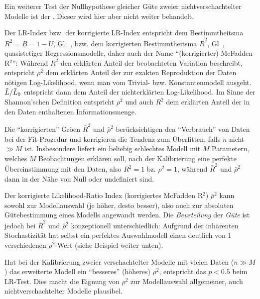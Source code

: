   \item Ein weiterer Test der Nullhypothese gleicher G\"ute zweier
    nichtverschachtelter Modelle ist der
    . Dieser wird hier aber nicht weiter
    behandelt.
    
\item Der LR-Index bzw. der korrigierte LR-Index 
entspricht dem Bestimmtheitsma\3
$R^2=B=1-U$, Gl.~,
bzw. dem korrigierten Bestimmtheitsma\3 $\bar{R}^2$,
Gl~,  quasistetiger Regressionsmodelle, daher auch
der Name ``(korrigierter) McFadden R$^2$'': 
 W\"ahrend $R^2$ den erkl\"arten Anteil der beobachteten Variation
beschreibt, entspricht $\rho^2$ dem erkl\"arten Anteil der zur exakten
Reproduktion der Daten n\"otigen Log-Likelihood, wenn man vom
Trivial- bzw. Konstantenmodell ausgeht. $\tilde{L}/\tilde{L}_0$ entspricht
dann dem Anteil der nichterkl\"arten Log-Likelihood. Im Sinne der
Shannon'schen Definition entspricht  $\rho^2$ und auch $R^2$
 dem erkl\"arten Anteil der in den Daten
 enthaltenen Informationsmenge.
 \item Die ``korrigierten'' Gr\"o\3en $\bar{R}^2$ und $\bar{\rho}^2$
   ber\"ucksichtigen den ``Verbrauch'' von Daten bei der Fit-Prozedur
   und korrigieren die Tendenz zum \"Uberfitten, falls $n$ nicht
   $\gg M$ ist. Insbesondere liefert ein beliebig schlechtes Modell
mit $M$ Parametern, welches $M$ Beobachtungen erkl\"aren soll, nach der
Kalibrierung eine perfekte \"Ubereinstimmung mit den Daten, 
also $R^2=1$ bz. $\rho^2=1$, w\"ahrend $\bar{R}^2$ und $\bar{\rho}^2$
dann in der N\"ahe von Null oder undefiniert sind.
 \item Der korrigierte Likelihood-Ratio
Index (korrigiertes McFadden R$^2$) $\bar{\rho}^2$ kann sowohl zur Modellauswahl (je
h\"oher, desto besser), also auch zur absoluten G\"utebestimmung eines
Modells angewandt werden. Die \emph{Beurteilung} der \emph{G\"ute} ist
jedoch bei $\bar{R}^2$ und $\bar{\rho}^2$ konzeptionell unterschiedlich: Aufgrund der
inh\"arenten Stochastizit\"at hat selbst ein perfektes Auswahlmodell
einen deutlich von 1 verschiedenen $\rho^2$-Wert (siehe Beispiel
weiter unten).

\item Hat bei der Kalibrierung zweier verschachtelter Modelle mit
vielen Daten ($n\gg  M$) das erweiterte Modell ein ``besseres''
(h\"oheres) $\rho^2$, entspricht das $p<0.5$ beim LR-Test. Dies
macht die Eignung von $\rho^2$ zur Modellauswahl allgemeiner,
auch nichtverschachtelter Modelle plausibel.

\ei



